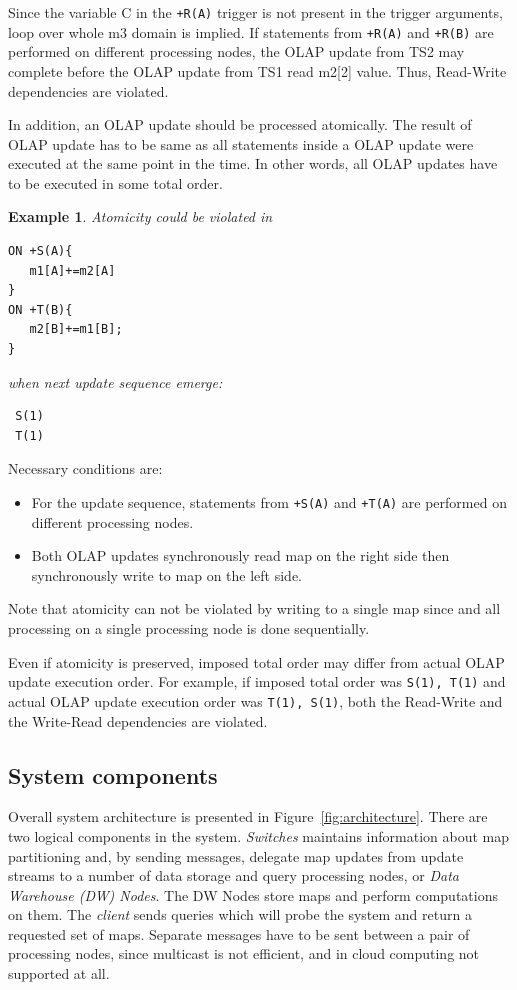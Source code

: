 \documentclass{sig-semester}
\newtheorem{example}[theorem]{Example}
\def\OLAP{OLAP\xspace}
\def\EXORD{actual OLAP update execution order\xspace}
\begin{document}
Since the variable C in the \texttt{+R(A)} trigger is not present in the trigger arguments, loop over whole m3 domain is implied. If statements from \texttt{+R(A)} and \texttt{+R(B)} are performed on different processing nodes, the \OLAP update from TS2 may complete before the \OLAP update from TS1 read m2[2] value. Thus, Read-Write dependencies are violated.

In addition, an \OLAP update should be processed atomically. The result of \OLAP update has to be same as all statements inside a \OLAP update were executed at the same point in the time. In other words, all \OLAP updates have to be executed in some total order.

\begin{example} \em
\label{ex:mulInput}
Atomicity could be violated in
\begin{verbatim}
ON +S(A){
   m1[A]+=m2[A]
}
ON +T(B){
   m2[B]+=m1[B];
}\end{verbatim}
when next update sequence emerge:
\begin{verbatim}
 S(1)
 T(1)
\end{verbatim}
\end{example}
Necessary conditions are:
\begin{itemize}
 \item For the update sequence, statements from \texttt{+S(A)} and \texttt{+T(A)} are performed on different processing nodes.
 \item Both \OLAP updates synchronously read map on the right side then synchronously write to map on the left side. 
\end{itemize}

Note that atomicity can not be violated by writing to a single map since and all processing on a single processing node is done sequentially.

Even if atomicity is preserved, imposed total order may differ from \EXORD. For example, if imposed total order was \texttt{S(1), T(1)} and \EXORD was \texttt{T(1), S(1)}, both the Read-Write and the Write-Read dependencies are violated.

\subsection{System components}
\label{Components}
\vspace{2mm}

Overall system architecture is presented in Figure~\ref{fig:architecture}. There are two logical components in the system.
\textit{Switches} maintains information about map partitioning and, by sending messages, delegate map updates from update streams to a number of data storage and query processing nodes, or \textit{Data Warehouse (DW) Nodes}. The DW Nodes store maps and perform computations on them. The \textit{client} sends queries which will probe the system and return a requested set of maps. Separate messages have to be sent between a pair of processing nodes, since multicast is not efficient, and in cloud computing not supported at all.
\end{document}

